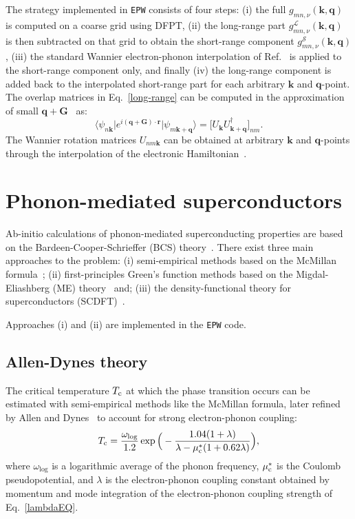 \documentclass[final,3p,times,twocolumn]{elsarticle}
\begin{document}
The strategy implemented in \texttt{EPW} consists of four steps: (i) the full $g_{mn,\nu}(\mathbf{k,q})$ is computed on a coarse grid using DFPT, (ii) the long-range part $g_{mn,\nu}^{\mathcal{L}}(\mathbf{k,q})$ is then subtracted on that grid to obtain the short-range component $g_{mn,\nu}^{\mathcal{S}}(\mathbf{k,q})$, (iii) the standard Wannier electron-phonon interpolation of Ref.~\cite{Giustino2007} is applied to the short-range component only, and finally (iv) the long-range component is added back to the interpolated short-range part for each arbitrary $\mathbf{k}$ and $\mathbf{q}$-point. 
The overlap matrices in Eq.~\eqref{long-range} can be computed in the approximation of small $\mathbf{q+G}$~\cite{Verdi2015} as:
\begin{equation}
\big\langle \psi_{n\mathbf{k}} \big| e^{i(\mathbf{q+G})\cdot \mathbf{r}} \big| \psi_{m\mathbf{k+q}} \big\rangle = \big[ U_{\mathbf{k}} U_{\mathbf{k+q}}^\dagger \big]_{nm}.
\end{equation}   
The Wannier rotation matrices $U_{nm\mathbf{k}}$ can be obtained at arbitrary $\mathbf{k}$ and $\mathbf{q}$-points through the interpolation of the electronic Hamiltonian~\cite{Souza2001}.

\section{Phonon-mediated superconductors}\label{supercond}

Ab-initio calculations of phonon-mediated superconducting properties are based on the Bardeen-Cooper-Schrieffer (BCS) theory~\cite{Bardeen1957}. There exist three main approaches to the problem: (i) semi-empirical methods based on the McMillan formula~\cite{McMillan1968}; (ii) first-principles Green's function methods based on the Migdal-Eliashberg (ME) theory~\cite{Migdal1958,Eliashberg1960,Eliashberg1961} and; (iii) the density-functional theory for superconductors (SCDFT)~\cite{Luders2005,Marques2005,Linscheid2015,Linscheid2015a}.

Approaches (i) and (ii) are implemented in the \texttt{EPW} code.


\subsection{Allen-Dynes theory} 
The critical temperature $T_{\rm c}$ at which the phase transition occurs can be estimated with semi-empirical methods like the McMillan formula, later refined by Allen and Dynes~\cite{Allen1975} to account for strong electron-phonon coupling:
\begin{equation}\label{ADTc}
T_{\rm c} = \frac{\omega_{\log}}{1.2} \exp\Big(-\frac{1.04(1+\lambda)}{\lambda-\mu_{\rm c}^*(1+0.62\lambda)}\Big),
\end{equation}
where $\omega_{\log}$ is a logarithmic average of the phonon frequency, $\mu_{\rm c}^*$ is the Coulomb pseudopotential, and $\lambda$ is the electron-phonon coupling constant obtained by momentum and mode integration of the electron-phonon coupling strength of Eq.~\eqref{lambdaEQ}. 
\end{document}
